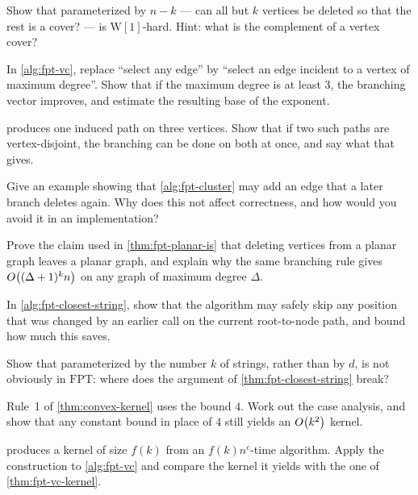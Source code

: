 \begin{exercise}
Show that  parameterized by $n - k$ --- can all but $k$
vertices be deleted so that the rest is a cover? --- is
$\mathrm{W}[1]$-hard. Hint: what is the complement of a vertex cover?
\end{exercise}

\begin{exercise}
In \cref{alg:fpt-vc}, replace ``select any edge'' by ``select an edge incident
to a vertex of maximum degree''. Show that if the maximum degree is at least
$3$, the branching vector improves, and estimate the resulting base of the
exponent.
\end{exercise}

\begin{exercise}
 produces one induced path on three vertices. Show that if
two such paths are vertex-disjoint, the branching can be done on both at once,
and say what that gives.
\end{exercise}

\begin{exercise}
Give an example showing that \cref{alg:fpt-cluster} may add an edge that a later
branch deletes again. Why does this not affect correctness, and how would you
avoid it in an implementation?
\end{exercise}

\begin{exercise}
Prove the claim used in \cref{thm:fpt-planar-is} that deleting vertices from a
planar graph leaves a planar graph, and explain why the same branching rule
gives $O\!\left((\Delta+1)^k n\right)$ on any graph of maximum degree $\Delta$.
\end{exercise}

\begin{exercise}
In \cref{alg:fpt-closest-string}, show that the algorithm may safely skip any
position that was changed by an earlier call on the current root-to-node path,
and bound how much this saves.
\end{exercise}

\begin{exercise}
Show that  parameterized by the number $k$ of strings,
rather than by $d$, is not obviously in $\mathrm{FPT}$: where does the argument
of \cref{thm:fpt-closest-string} break?
\end{exercise}

\begin{exercise}
Rule~1 of \cref{thm:convex-kernel} uses the bound $4$. Work out the case
analysis, and show that any constant bound in place of $4$ still yields an
$O\!\left(k^2\right)$ kernel.
\end{exercise}

\begin{exercise}
 produces a kernel of size $f(k)$ from an
$f(k)n^c$-time algorithm. Apply the construction to \cref{alg:fpt-vc} and
compare the kernel it yields with the one of \cref{thm:fpt-vc-kernel}.
\end{exercise}
